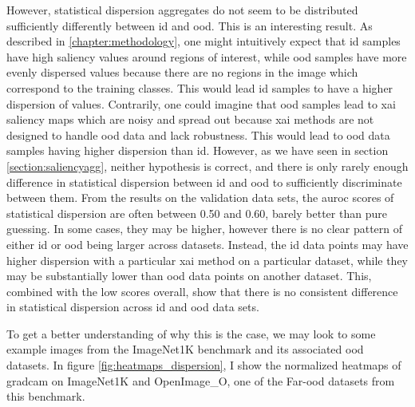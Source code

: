 \documentclass[UKenglish]{uiomasterthesis} %
\theoremstyle{definition}
\begin{document}
However, statistical dispersion aggregates do not seem to be distributed sufficiently differently between \ac{id} and \ac{ood}. This is an interesting result. As described in \ref{chapter:methodology}, one might intuitively expect that \ac{id} samples have high saliency values around regions of interest, while \ac{ood} samples have more evenly dispersed values because there are no regions in the image which correspond to the training classes. This would lead \ac{id} samples to have a higher dispersion of values. Contrarily, one could imagine that \ac{ood} samples lead to \ac{xai} saliency maps which are noisy and spread out because \ac{xai} methods are not designed to handle \ac{ood} data and lack robustness. This would lead to \ac{ood} data samples having higher dispersion than \ac{id}. However, as we have seen in section \ref{section:saliencyagg}, neither hypothesis is correct, and there is only rarely enough difference in statistical dispersion between \ac{id} and \ac{ood} to sufficiently discriminate between them. From the results on the validation data sets, the \ac{auroc} scores of statistical dispersion are often between 0.50 and 0.60, barely better than pure guessing. In some cases, they may be higher, however there is no clear pattern of either \ac{id} or \ac{ood} being larger across datasets. Instead, the \ac{id} data points may have higher dispersion with a particular \ac{xai} method on a particular dataset, while they may be substantially lower than \ac{ood} data points on another dataset. This, combined with the low scores overall, show that there is no consistent difference in statistical dispersion across \ac{id} and \ac{ood} data sets.

To get a better understanding of why this is the case, we may look to some example images from the ImageNet1K benchmark and its associated \ac{ood} datasets. In figure \ref{fig:heatmaps_dispersion}, I show the normalized heatmaps of \ac{gradcam} on ImageNet1K and OpenImage\_O, one of the Far-\ac{ood} datasets from this benchmark.
\end{document}
